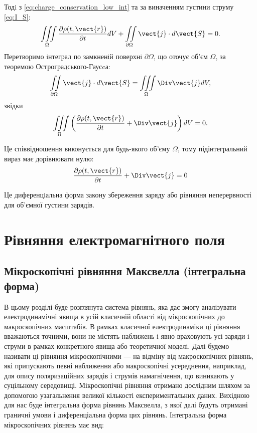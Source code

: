 Тодi з \eqref{eq:charge_conservation_low_int}  та за виначенням густини струму \eqref{eq:I_S}:
\begin{equation*}
    \iiint\limits_{\Omega} \frac{\partial\rho(t, \vect{r})}{\partial
    t} dV + \iint\limits_{\partial\Omega} \vect{j}\cdot d\vect{S} = 0.
\end{equation*}
Перетворимо iнтеграл по замкненiй поверхнi $\partial\Omega$, що оточує об'єм $\Omega$, за
теоремою Остроградського-Гаусcа:
\begin{equation*}
    \iint\limits_{\partial\Omega} \vect{j}\cdot d\vect{S} = \iiint\limits_{\Omega}\Div\vect{j} dV,
\end{equation*}
звідки
\begin{equation*}
    \iiint\limits_{\Omega} \left(\frac{\partial\rho(t, \vect{r})}{\partial
    t}  +  \Div\vect{j} \right) dV =0.
\end{equation*}

Це співвідношення виконується для будь-якого об'єму $\Omega$, тому
підінтегральний вираз має дорівнювати нулю:
\begin{equation}\label{eq:charge_conservation_low_diff}
    \frac{\partial\rho(t, \vect{r})}{\partial t}  +  \Div\vect{j}  = 0
\end{equation}

Це диференцiальна форма закону збереження заряду або рівняння неперервності для об’ємної густини зарядів.


\section{Рівняння електромагнітного поля}


\subsection*{Мікроскопічні рівняння Максвелла (інтегральна форма)}


В цьому розділі буде розглянута система рівнянь, яка дає змогу аналізувати електродинамічні явища в усій класичній області від мікроскопічних до
макроскопічних масштабів. В рамках класичної електродинаміки ці рівняння вважаються точними, вони не містять наближень і явно враховують усі заряди і
струми в рамках конкретного явища або теоретичної моделі. Далі будемо називати ці рівняння мікроскопічними --- на відміну від макроскопічних рівнянь,
які
припускають певні наближення або макроскопічні усереднення, наприклад, для опису поляризаційних зарядів і струмів намагнічення, що виникають у
суцільному середовищі. Мікроскопічні рівняння отримано дослідним шляхом за допомогою узагальнення великої кількості експериментальних даних. Вихідною
для нас буде інтегральна форма рівнянь Максвелла, з якої далі будуть отримані граничні умови і диференціальна форма цих рівнянь. Інтегральна форма
мікроскопічних рівнянь має вид:


